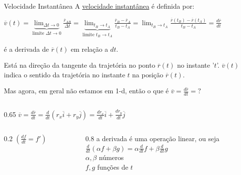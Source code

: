 \documentclass{beamer}
\begin{document}
	\begin{frame}{Velocidade Instantânea}
		\small
		A \underline{velocidade instantânea} é definida por:
		

		$\displaystyle \overline{v}(t) = \underbrace{\lim_{\Delta t \to 0}}_{\text{limite } \Delta t \to 0} \frac{\overline{r}_{AB}}{\Delta t} = \underbrace{\lim_{t_B \to t_A}}_{\text{limite } t_B \to t_A} \frac{\overline{r}_B - \overline{r}_A}{t_B - t_A} = \lim_{t_B \to t_A} \frac{\overline{r}(t_B) - \overline{r}(t_A)}{t_B - t_A} = \frac{d\overline{r}}{dt}$
		
		\vspace{0.1cm}
		\hfill \scriptsize é a derivada de $\overline{r}(t)$ em relação a $dt$.
		
		\vspace{0.2cm}
		\small
		Está na direção da tangente da trajetória no ponto $\overline{r}(t)$ no instante '$t$'. $\overline{v}(t)$ indica o sentido da trajetória no instante $t$ na posição $\overline{r}(t)$.
		
		\vspace{0.2cm}
		Mas agora, em geral não estamos em 1-d, então o que é $\displaystyle \overline{v} = \frac{d\overline{r}}{dt} = ?$
		
		\vspace{0.2cm}
		\begin{columns}[T]
			\begin{column}{0.65\textwidth}
				$\displaystyle \overline{v} = \frac{d\overline{r}}{dt} = \frac{d}{dt} \left(r_x \overline{i} + r_y \overline{j}\right) = \frac{dr_x}{dt} \overline{i} + \frac{dr_y}{dt} \overline{j}$
				
				\vspace{0.2cm}
				\begin{columns}[T]
					\begin{column}{0.2\textwidth}
						\vspace{0.2cm}
						$\displaystyle \left(\frac{df}{dt} = f'\right)$
					\end{column}
					\begin{column}{0.8\textwidth}
						\scriptsize
						a derivada é uma operação linear, ou seja \\
						\vspace{0.1cm}
						$\displaystyle \frac{d}{dt}(\alpha f + \beta g) = \alpha \frac{d}{dt}f + \beta \frac{d}{dt}g$ \\
						\vspace{0.1cm}
						$\alpha, \beta$ números \\
						$f, g$ funções de $t$
					\end{column}
				\end{columns}
			\end{column}
			

\end{columns}
\end{frame}
\end{document}
